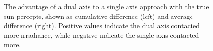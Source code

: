 \documentclass{article}
\begin{document}
{%
\begin{figure}[!t]
\begin{center}
\caption{The advantage of a dual axis to a single axis approach with the true sun percepts, shown as cumulative difference (left) and average difference (right). Positive values indicate the dual axis contacted more irradiance, while negative indicate the single axis contacted more.}
\label{fig:results_axis}
\end{center}
\end{figure}





}
\end{document}
